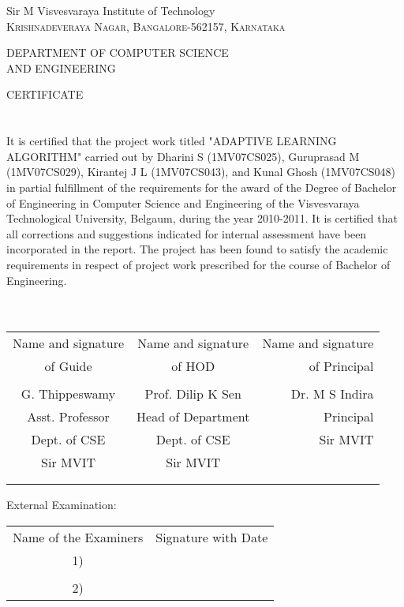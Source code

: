 \documentclass[10pt,a4paper]{article}
\newcommand{\tab}{\hspace*{1 cm}}
\begin{document}
\begin {center}
\LARGE{Sir M Visvesvaraya Institute of Technology }\\
\normalsize
\textsc{Krishnadeveraya Nagar, Bangalore-562157, Karnataka\\ }


\tab DEPARTMENT OF COMPUTER SCIENCE \\ \tab\tab AND ENGINEERING
\end{center} 

								\tab\tab\tab\tab\textup{\Large CERTIFICATE} \\ \\ \\

It is certified that the project work titled "ADAPTIVE LEARNING ALGORITHM" carried out by Dharini S (1MV07CS025), Guruprasad M (1MV07CS029), Kirantej J L (1MV07CS043), and Kunal Ghosh (1MV07CS048) in partial fulfillment of the requirements for the award of the Degree of Bachelor of Engineering in Computer Science and Engineering of the Visvesvaraya Technological University, Belgaum, during the year 2010-2011. It is certified that all corrections and suggestions indicated for internal assessment have been incorporated in the report. The project has been found to satisfy the academic requirements in respect of project work prescribed for the course of Bachelor of Engineering.\\ \\ \\


\begin{table}[h]
\begin{tabular}{c c r} \\
Name and signature \tab & Name and signature \tab  & Name and signature  \\
of Guide   \tab &   of HOD             \tab & \tab of Principal \\
\\ 
G. Thippeswamy \tab & Prof. Dilip K Sen \tab & Dr. M S Indira \\
Asst. Professor \tab & Head of Department \tab & Principal \\
Dept. of CSE	\tab & Dept. of CSE \tab &	Sir MVIT \\
Sir MVIT \tab & Sir MVIT \tab \\ \\ \\ 
\end{tabular}
\end{table}



External Examination:
\begin{table}[h]
\begin{tabular}{c r}
Name of the Examiners\tab \tab \tab &	Signature with Date \\
1)
\\ \\
2)
\end{tabular}
\end{table}
\end{document}
